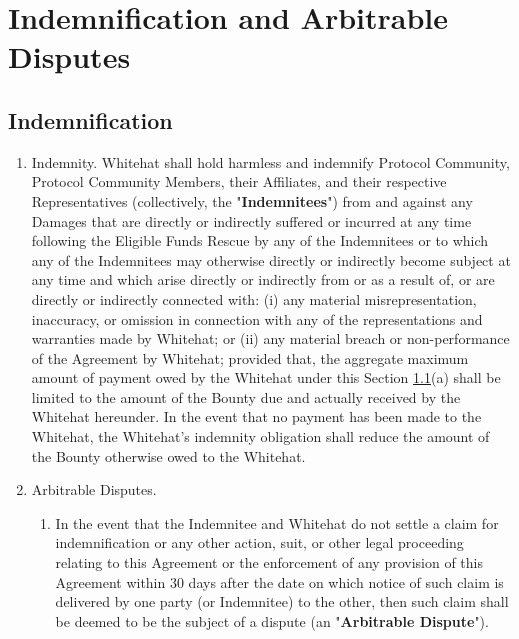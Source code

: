 \documentclass{article}
\begin{document}
\section{Indemnification and Arbitrable Disputes}\label{sec:indemnification}

\subsection{Indemnification}\label{subsec:indemnity}

\begin{enumerate}

    \item Indemnity. Whitehat shall hold harmless and indemnify Protocol Community, Protocol Community Members, their Affiliates, and their respective Representatives (collectively, the "\textbf{Indemnitees}") from and against any Damages that are directly or indirectly suffered or incurred at any time following the Eligible Funds Rescue by any of the Indemnitees or to which any of the Indemnitees may otherwise directly or indirectly become subject at any time and which arise directly or indirectly from or as a result of, or are directly or indirectly connected with: (i) any material misrepresentation, inaccuracy, or omission in connection with any of the representations and warranties made by Whitehat; or (ii) any material breach or non-performance of the Agreement by Whitehat; provided that, the aggregate maximum amount of payment owed by the Whitehat under this Section \ref{subsec:indemnity}(a) shall be limited to the amount of the Bounty due and actually received by the Whitehat hereunder. In the event that no payment has been made to the Whitehat, the Whitehat's indemnity obligation shall reduce the amount of the Bounty otherwise owed to the Whitehat.

    \item Arbitrable Disputes.\label{subsec:arbitrable_disputes}

          \begin{enumerate}

              \item In the event that the Indemnitee and Whitehat do not settle a claim for indemnification or any other action, suit, or other legal proceeding relating to this Agreement or the enforcement of any provision of this Agreement within 30 days after the date on which notice of such claim is delivered by one party (or Indemnitee) to the other, then such claim shall be deemed to be the subject of a dispute (an "\textbf{Arbitrable Dispute}").


\end{enumerate}
\end{enumerate}
\end{document}
